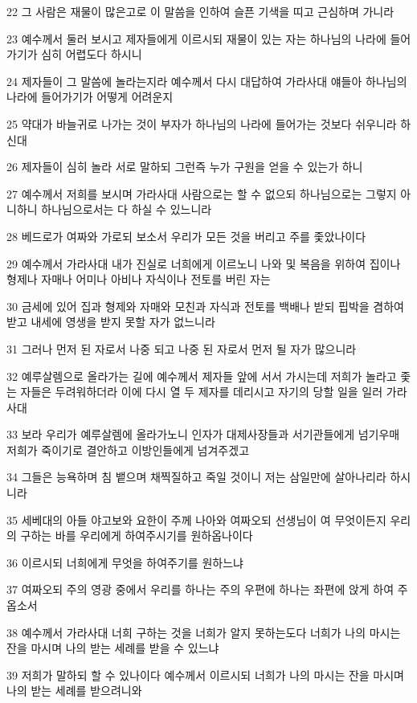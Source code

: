 \par 22 그 사람은 재물이 많은고로 이 말씀을 인하여 슬픈 기색을 띠고 근심하며 가니라
\par 23 예수께서 둘러 보시고 제자들에게 이르시되 재물이 있는 자는 하나님의 나라에 들어가기가 심히 어렵도다 하시니
\par 24 제자들이 그 말씀에 놀라는지라 예수께서 다시 대답하여 가라사대 얘들아 하나님의 나라에 들어가기가 어떻게 어려운지
\par 25 약대가 바늘귀로 나가는 것이 부자가 하나님의 나라에 들어가는 것보다 쉬우니라 하신대
\par 26 제자들이 심히 놀라 서로 말하되 그런즉 누가 구원을 얻을 수 있는가 하니
\par 27 예수께서 저희를 보시며 가라사대 사람으로는 할 수 없으되 하나님으로는 그렇지 아니하니 하나님으로서는 다 하실 수 있느니라
\par 28 베드로가 여짜와 가로되 보소서 우리가 모든 것을 버리고 주를 좇았나이다
\par 29 예수께서 가라사대 내가 진실로 너희에게 이르노니 나와 및 복음을 위하여 집이나 형제나 자매나 어미나 아비나 자식이나 전토를 버린 자는
\par 30 금세에 있어 집과 형제와 자매와 모친과 자식과 전토를 백배나 받되 핍박을 겸하여 받고 내세에 영생을 받지 못할 자가 없느니라
\par 31 그러나 먼저 된 자로서 나중 되고 나중 된 자로서 먼저 될 자가 많으니라
\par 32 예루살렘으로 올라가는 길에 예수께서 제자들 앞에 서서 가시는데 저희가 놀라고 좇는 자들은 두려워하더라 이에 다시 열 두 제자를 데리시고 자기의 당할 일을 일러 가라사대
\par 33 보라 우리가 예루살렘에 올라가노니 인자가 대제사장들과 서기관들에게 넘기우매 저희가 죽이기로 결안하고 이방인들에게 넘겨주겠고
\par 34 그들은 능욕하며 침 뱉으며 채찍질하고 죽일 것이니 저는 삼일만에 살아나리라 하시니라
\par 35 세베대의 아들 야고보와 요한이 주께 나아와 여짜오되 선생님이 여 무엇이든지 우리의 구하는 바를 우리에게 하여주시기를 원하옵나이다
\par 36 이르시되 너희에게 무엇을 하여주기를 원하느냐
\par 37 여짜오되 주의 영광 중에서 우리를 하나는 주의 우편에 하나는 좌편에 앉게 하여 주옵소서
\par 38 예수께서 가라사대 너희 구하는 것을 너희가 알지 못하는도다 너희가 나의 마시는 잔을 마시며 나의 받는 세례를 받을 수 있느냐
\par 39 저희가 말하되 할 수 있나이다 예수께서 이르시되 너희가 나의 마시는 잔을 마시며 나의 받는 세례를 받으려니와

